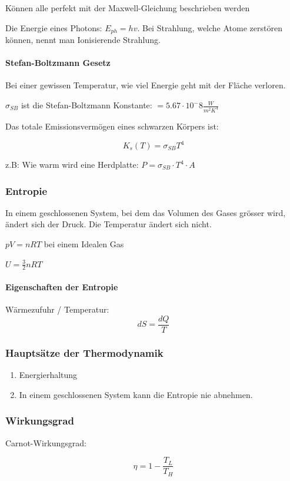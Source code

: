 \documentclass[a4paper]{scrartcl}
\begin{document}
Können alle perfekt mit der Maxwell-Gleichung beschrieben werden


Die Energie eines Photons: $E_{ph} = hv$. Bei Strahlung, welche Atome zerstören können, nennt man Ionisierende Strahlung.




\paragraph{Stefan-Boltzmann Gesetz}

Bei einer gewissen Temperatur, wie viel Energie geht mit der Fläche verloren.

$\sigma_{SB}$ ist die Stefan-Boltzmann Konstante: $=5.67 \cdot 10^-8 \frac{W}{m^2 K^4}$

Das totale Emissionsvermögen eines schwarzen Körpers ist:

\[
	K_s(T) = \sigma_{SB} T^4
\]

z.B: Wie warm wird eine Herdplatte: $P = \sigma_{SB} \cdot T^4 \cdot A$

 
\subsubsection{Entropie}

In einem geschlossenen System, bei dem das Volumen des Gases grösser wird, ändert sich der Druck. Die Temperatur ändert sich nicht.

$pV = nRT$ bei einem Idealen Gas

$U = \frac{3}{2} nRT$


\paragraph{Eigenschaften der Entropie}

Wärmezufuhr / Temperatur:
\[
	dS = \frac{dQ}{T}
\]

\subsubsection{Hauptsätze der Thermodynamik}

\begin{enumerate}
	\item Energierhaltung
	\item In einem geschlossenen System kann die Entropie nie abnehmen.
\end{enumerate}


\subsubsection{Wirkungsgrad}

Carnot-Wirkungsgrad:

\[
	\eta = 1 - \frac{T_L}{T_H}
\]
\end{document}

